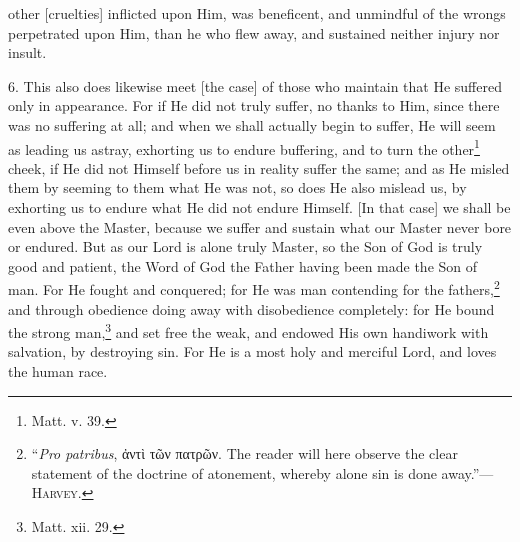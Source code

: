 other [cruelties] inflicted upon Him, was beneficent, and unmindful of the wrongs perpetrated upon Him, than he who flew away, and sustained neither injury nor insult.

6. This also does likewise meet [the case] of those who maintain that He suffered only in appearance. For if He did not truly suffer, no thanks to Him, since there was no suffering at all; and when we shall actually begin to suffer, He will seem as leading us astray, exhorting us to endure buffering, and to turn the other\footnote{Matt. v. 39.} cheek, if He did not Himself before us in reality suffer the same; and as He misled them by seeming to them what He was not, so does He also mislead us, by exhorting us to endure what He did not endure Himself. [In that case] we shall be even above the Master, because we suffer and sustain what our Master never bore or endured. But as our Lord is alone truly Master, so the Son of God is truly good and patient, the Word of God the Father having been made the Son of man. For He fought and conquered; for He was man contending for the fathers,\footnote{“\emph{Pro patribus}, \textgreek{ἀντὶ τῶν πατρῶν}. The reader will here observe the clear statement of the doctrine of atonement, whereby alone sin is done away.”—\textsc{Harvey}.} and  through obedience doing away with disobedience completely: for He bound the strong man,\footnote{Matt. xii. 29.} and set free the weak, and endowed His own handiwork with salvation, by destroying sin. For He is a most holy and merciful Lord, and loves the human race.

